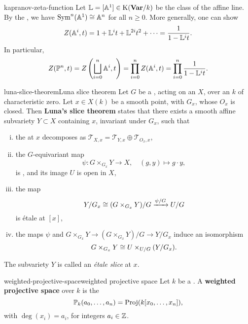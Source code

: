 \begin{example}{kapranov-zeta-function}
    Let $\mathbb{L} = [\AA^1] \in \textup{K}(\textbf{Var}/k)$ be the class of the affine line. By the , we have $\operatorname{Sym}^n(\AA^1) \isom \AA^n$ for all $n \ge 0$. More generally, one can show
    \[ Z(\AA^i, t) = 1 + \mathbb{L}^i t + \mathbb{L}^{2i} t^2 + \cdots = \frac{1}{1 - \mathbb{L}^i t} . \]
    In particular,
    \[ Z(\PP^n, t) = Z\left(\bigsqcup_{i = 0}^{n} \AA^i , t\right) = \prod_{i = 0}^{n} Z(\AA^i, t) = \prod_{i = 0}^{n} \frac{1}{1 - \mathbb{L}^i t} . \]
\end{example}

\begin{topic}{luna-slice-theorem}{Luna slice theorem}
    Let $G$ be a  , acting on an  $X$, over an  $k$ of characteristic zero. Let $x \in X(k)$ be a smooth point, with  $G_x$, whose  $O_x$ is closed. Then \textbf{Luna's slice theorem} states that there exists a smooth affine subvariety $Y \subset X$ containing $x$, invariant under $G_x$, such that
    \begin{enumerate}[(i)]
        \item the  at $x$ decomposes as $\mathcal{T}_{X, x} = \mathcal{T}_{Y, x} \oplus \mathcal{T}_{O_x, x}$,
        \item the $G$-equivariant map
        \[ \psi : G \times_{G_x} Y \to X, \quad (g, y) \mapsto g \cdot y , \]
        is , and its image $U$ is open in $X$,
        \item the map
        \[ Y/G_x \isom (G \times_{G_x} Y) / G \xrightarrow{\psi / G} U / G \]
        is étale at $[x]$,
        \item the maps $\psi$ and $G \times_{G_x} Y \to (G \times_{G_x} Y) / G \to Y / G_x$ induce an isomorphism
        \[ G \times_{G_x} Y \isom U \times_{U/G} (Y/G_x) . \]
    \end{enumerate}
    The subvariety $Y$ is called an \textit{étale slice} at $x$.
\end{topic}

\begin{topic}{weighted-projective-space}{weighted projective space}
    Let $k$ be a . A \textbf{weighted projective space} over $k$ is the 
    \[ \PP_k(a_0, \ldots, a_n) = \textup{Proj}(k[x_0, \ldots, x_n]) , \]
    with $\deg(x_i) = a_i$, for integers $a_i \in \ZZ$.
\end{topic}

